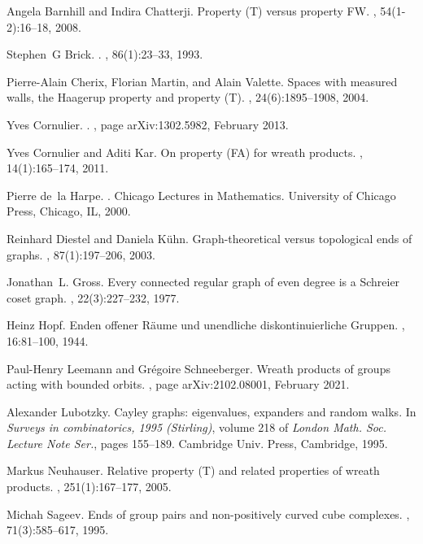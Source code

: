 \documentclass[a4paper]{article}
\theoremstyle{definition}
\theoremstyle{remark}
\begin{document}
\begin{thebibliography}{10}

Angela Barnhill and Indira Chatterji.
\newblock Property ({T}) versus property {FW}.
, 54(1-2):16--18, 2008.

Stephen~G Brick.
.
, 86(1):23--33, 1993.

Pierre-Alain Cherix, Florian Martin, and Alain Valette.
\newblock Spaces with measured walls, the {H}aagerup property and property
  ({T}).
, 24(6):1895--1908, 2004.

Yves {Cornulier}.
.
, page arXiv:1302.5982, February 2013.

Yves Cornulier and Aditi Kar.
\newblock On property ({FA}) for wreath products.
, 14(1):165--174, 2011.

Pierre de~la Harpe.
.
\newblock Chicago Lectures in Mathematics. University of Chicago Press,
  Chicago, IL, 2000.

Reinhard Diestel and Daniela K\"{u}hn.
\newblock Graph-theoretical versus topological ends of graphs.
, 87(1):197--206, 2003.

Jonathan~L. Gross.
\newblock Every connected regular graph of even degree is a {S}chreier coset
  graph.
, 22(3):227--232, 1977.

Heinz Hopf.
\newblock Enden offener {R}\"{a}ume und unendliche diskontinuierliche
  {G}ruppen.
, 16:81--100, 1944.

Paul-Henry Leemann and Gr{\'e}goire Schneeberger.
\newblock Wreath products of groups acting with bounded orbits.
, page arXiv:2102.08001, February 2021.

Alexander Lubotzky.
\newblock Cayley graphs: eigenvalues, expanders and random walks.
\newblock In {\em Surveys in combinatorics, 1995 ({S}tirling)}, volume 218 of
  {\em London Math. Soc. Lecture Note Ser.}, pages 155--189. Cambridge Univ.
  Press, Cambridge, 1995.

Markus Neuhauser.
\newblock Relative property ({T}) and related properties of wreath products.
, 251(1):167--177, 2005.

Michah Sageev.
\newblock Ends of group pairs and non-positively curved cube complexes.
, 71(3):585--617, 1995.

\end{thebibliography}

%
%
%
%
%
\enddocument
\end{document}
